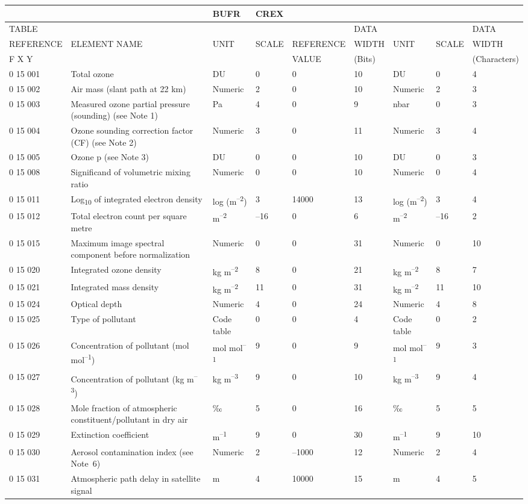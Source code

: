 \begin{longtable}[]{@{}lllllllll@{}}
\toprule
& & BUFR & CREX & & & & &\tabularnewline
\midrule
\endhead
TABLE & & & & & DATA & & & DATA\tabularnewline
REFERENCE & ELEMENT NAME & UNIT & SCALE & REFERENCE & WIDTH & UNIT & SCALE & WIDTH\tabularnewline
F X Y & & & & VALUE & (Bits) & & & (Characters)\tabularnewline
0 15 001 & Total ozone & DU & 0 & 0 & 10 & DU & 0 & 4\tabularnewline
0 15 002 & Air mass (slant path at 22 km) & Numeric & 2 & 0 & 10 & Numeric & 2 & 3\tabularnewline
0 15 003 & Measured ozone partial pressure (sounding) (see Note 1) & Pa & 4 & 0 & 9 & nbar & 0 & 3\tabularnewline
0 15 004 & Ozone sounding correction factor (CF) (see Note 2) & Numeric & 3 & 0 & 11 & Numeric & 3 & 4\tabularnewline
0 15 005 & Ozone p (see Note 3) & DU & 0 & 0 & 10 & DU & 0 & 3\tabularnewline
0 15 008 & Significand of volumetric mixing ratio & Numeric & 0 & 0 & 10 & Numeric & 0 & 4\tabularnewline
0 15 011 & Log\textsubscript{10} of integrated electron density & log (m\textsuperscript{--2}) & 3 & 14000 & 13 & log (m\textsuperscript{--2}) & 3 & 4\tabularnewline
0 15 012 & Total electron count per square metre & m\textsuperscript{--2} & --16 & 0 & 6 & m\textsuperscript{--2} & --16 & 2\tabularnewline
0 15 015 & Maximum image spectral component before normalization & Numeric & 0 & 0 & 31 & Numeric & 0 & 10\tabularnewline
0 15 020 & Integrated ozone density & kg m\textsuperscript{--2} & 8 & 0 & 21 & kg m\textsuperscript{--2} & 8 & 7\tabularnewline
0 15 021 & Integrated mass density & kg m\textsuperscript{--2} & 11 & 0 & 31 & kg m\textsuperscript{--2} & 11 & 10\tabularnewline
0 15 024 & Optical depth & Numeric & 4 & 0 & 24 & Numeric & 4 & 8\tabularnewline
0 15 025 & Type of pollutant & Code table & 0 & 0 & 4 & Code table & 0 & 2\tabularnewline
0 15 026 & Concentration of pollutant (mol mol\textsuperscript{--1}) & mol mol\textsuperscript{--1} & 9 & 0 & 9 & mol mol\textsuperscript{--1} & 9 & 3\tabularnewline
0 15 027 & Concentration of pollutant (kg m\textsuperscript{--3}) & kg m\textsuperscript{--3} & 9 & 0 & 10 & kg m\textsuperscript{--3} & 9 & 4\tabularnewline
0 15 028 & Mole fraction of atmospheric constituent/pollutant in dry air & ‰ & 5 & 0 & 16 & ‰ & 5 & 5\tabularnewline
0 15 029 & Extinction coefficient & m\textsuperscript{--1} & 9 & 0 & 30 & m\textsuperscript{--1} & 9 & 10\tabularnewline
0 15 030 & Aerosol contamination index (see Note~6) & Numeric & 2 & --1000 & 12 & Numeric & 2 & 4\tabularnewline
0 15 031 & Atmospheric path delay in satellite signal & m & 4 & 10000 & 15 & m & 4 & 5\tabularnewline
\bottomrule
\end{longtable}

